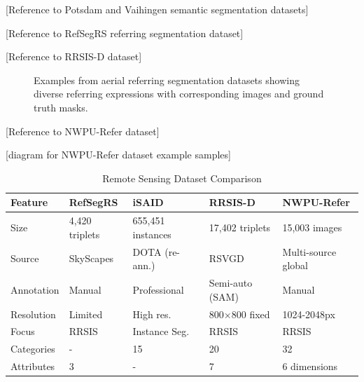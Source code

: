 [Reference to Potsdam and Vaihingen semantic segmentation datasets] %

[Reference to RefSegRS referring segmentation dataset] %

[Reference to RRSIS-D dataset] %

\begin{figure}[htbp]
\centering
{}
\hfill
{}
\caption{Examples from aerial referring segmentation datasets showing diverse referring expressions with corresponding images and ground truth masks.}
\label{fig:aerial_datasets}
\end{figure}

[Reference to NWPU-Refer dataset] %

[diagram for NWPU-Refer dataset example samples]

\begin{table}[htbp]
\centering
\caption{Remote Sensing Dataset Comparison}
\label{tab:dataset_comparison}
\begin{tabular}{@{}lllll@{}}
\toprule
\textbf{Feature} & \textbf{RefSegRS} & \textbf{iSAID} & \textbf{RRSIS-D} & \textbf{NWPU-Refer} \\
\midrule
Size & 4,420 triplets & 655,451 instances & 17,402 triplets & 15,003 images \\
Source & SkyScapes & DOTA (re-ann.) & RSVGD & Multi-source global \\
Annotation & Manual & Professional & Semi-auto (SAM) & Manual \\
Resolution & Limited & High res. & 800×800 fixed & 1024-2048px \\
Focus & RRSIS & Instance Seg. & RRSIS & RRSIS \\
Categories & - & 15 & 20 & 32 \\
Attributes & 3 & - & 7 & 6 dimensions \\
\bottomrule
\end{tabular}
\end{table}

